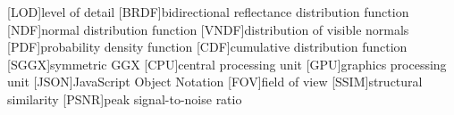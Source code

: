 [LOD]{level of detail}
[BRDF]{bidirectional reflectance distribution function}
[NDF]{normal distribution function}
[VNDF]{distribution of visible normals}
[PDF]{probability density function}
[CDF]{cumulative distribution function}
[SGGX]{symmetric GGX}
[CPU]{central processing unit}
[GPU]{graphics processing unit}
[JSON]{JavaScript Object Notation}
[FOV]{field of view}
[SSIM]{structural similarity}
[PSNR]{peak signal-to-noise ratio}
